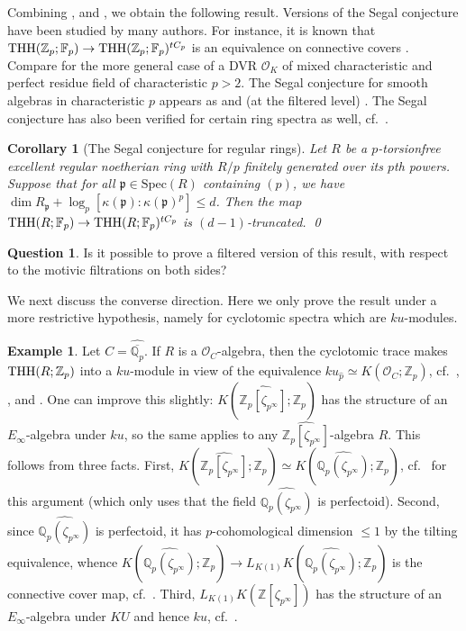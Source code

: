 \documentclass{amsart}
\newtheorem{corollary}[theorem]{Corollary}
\theoremstyle{definition}
\newtheorem{question}[theorem]{Question}
\newcommand{\spec}{\mathrm{Spec}}
\newtheorem{example}[theorem]{Example}
\begin{document}
Combining 
, and , we obtain the following result. 
Versions of the Segal conjecture have been studied by many authors. 
For instance, it is known that $\mathrm{THH}(\mathbb{Z}_p; \mathbb{F}_p) \to \mathrm{THH}(\mathbb{Z}_p;
\mathbb{F}_p)^{tC_p}$ is an equivalence on connective covers
\cite[Lem.~6.5]{BM94}. 
Compare \cite{HM03} for the more general case of a DVR $\mathcal{O}_K$ of mixed
characteristic and perfect residue field of characteristic $p>2$. 
The Segal conjecture for smooth algebras in characteristic $p$ appears as 
\cite[Prop.~6.6]{Hes16} and (at the filtered level) \cite[Cor.~8.18]{BMS2}. 
The Segal conjecture has also been verified for certain ring spectra as well,
cf.~\cite{AR02, LNR11, AKQ}. 


\begin{corollary}[The Segal conjecture for regular rings] 
Let $R$ be a $p$-torsionfree excellent regular noetherian ring with $R/p$ finitely generated over its
$p$th powers.
Suppose
that
for all $\mathfrak{p} \in \spec(R)$ containing $(p)$, we have
$\dim R_{\mathfrak{p}} + \log_p [ \kappa(\mathfrak{p}):\kappa(\mathfrak{p})^p]
\leq d$. 
Then the map 
$\mathrm{THH}(R; \mathbb{F}_p) \to \mathrm{THH}(R; \mathbb{F}_p)^{tC_p}$ is 
$(d-1)$-truncated.
 \qed
\end{corollary} 


\begin{question} 
Is it  possible to prove a filtered version of this
result, with respect to the motivic filtrations \cite{BMS2} on both sides? 
\end{question} 

We next discuss the converse direction. 
Here we only prove the result under a more restrictive hypothesis, namely for
cyclotomic spectra which are $ku$-modules. 

\begin{example} 
\label{ppowerrootsku}
Let $C = \widehat{\overline{\mathbb{Q}_p}}$. 
If $R$ is a $\mathcal{O}_C$-algebra, then the cyclotomic trace
makes $\mathrm{THH}(R; \mathbb{Z}_p)$ into a $ku$-module in view of the equivalence
$ku_{\hat{p}} \simeq K(\mathcal{O}_C; \mathbb{Z}_p)$,
cf.~\cite[Lem.~3.1]{Niz98}, \cite{Suslin}, and \cite{Hes06}. 
One can improve this slightly: $K(
\widehat{\mathbb{Z}_p[\zeta_{p^\infty}]};
\mathbb{Z}_p)$ has the structure of an $E_\infty$-algebra under $ku$, so the
same applies to any 
$\widehat{\mathbb{Z}_p[\zeta_{p^\infty}]}$-algebra  $R$. 
 This
follows from three facts. 
First, 
$K( \widehat{\mathbb{Z}_p[\zeta_{p^\infty}]}; \mathbb{Z}_p) \simeq K(
\widehat{\mathbb{Q}_p(\zeta_{p^\infty})}; \mathbb{Z}_p)$,
cf.~\cite[Lem.~1.3.7]{HN} for this argument (which only uses that the field 
$\widehat{\mathbb{Q}_p(\zeta_{p^\infty})}$ is perfectoid). 
Second, since 
$\widehat{\mathbb{Q}_p(\zeta_{p^\infty})}$  is perfectoid, it has
$p$-cohomological dimension $\leq 1$ by the tilting equivalence, whence 
$K(\widehat{\mathbb{Q}_p(\zeta_{p^\infty})}; \mathbb{Z}_p) \to
L_{K(1)}K(\widehat{\mathbb{Q}_p(\zeta_{p^\infty})}; \mathbb{Z}_p)$  is the
connective cover map, cf.~. Third, 
$L_{K(1)} K(\mathbb{Z}[\zeta_{p^\infty}])$ has the structure of an
$E_\infty$-algebra under $KU$ and hence $ku$, cf.~\cite[Construction 3.7]{BCM}. 
\end{example} 
\end{document}
